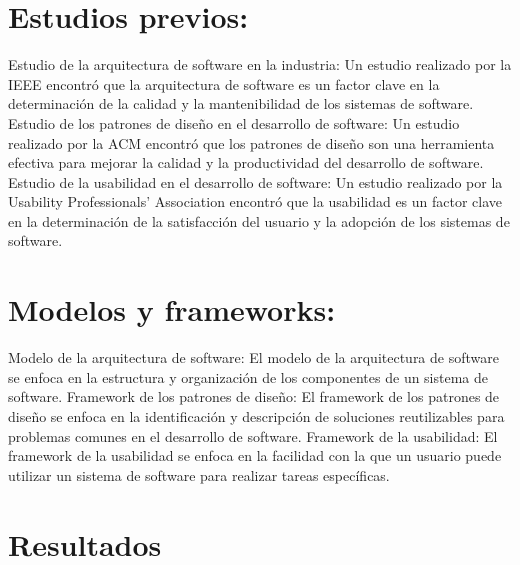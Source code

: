 \documentclass[twocolumn]{article}
\begin{document}
\section{Estudios previos:}
Estudio de la arquitectura de software en la industria: Un estudio realizado por la IEEE encontró que la arquitectura de software es un factor clave en la determinación de la calidad y la mantenibilidad de los sistemas de software.
Estudio de los patrones de diseño en el desarrollo de software: Un estudio realizado por la ACM encontró que los patrones de diseño son una herramienta efectiva para mejorar la calidad y la productividad del desarrollo de software.
Estudio de la usabilidad en el desarrollo de software: Un estudio realizado por la Usability Professionals' Association encontró que la usabilidad es un factor clave en la determinación de la satisfacción del usuario y la adopción de los sistemas de software.

\section{Modelos y frameworks:}
Modelo de la arquitectura de software: El modelo de la arquitectura de software se enfoca en la estructura y organización de los componentes de un sistema de software.
Framework de los patrones de diseño: El framework de los patrones de diseño se enfoca en la identificación y descripción de soluciones reutilizables para problemas comunes en el desarrollo de software.
Framework de la usabilidad: El framework de la usabilidad se enfoca en la facilidad con la que un usuario puede utilizar un sistema de software para realizar tareas específicas.


\section{Resultados}
\vspace{0.5cm}
\end{document}
